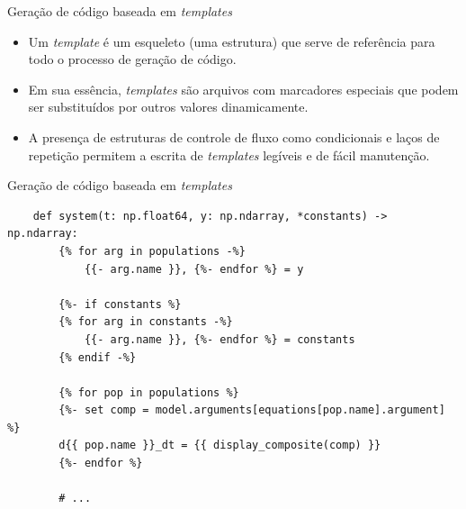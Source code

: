\begin{frame}{Geração de código baseada em \textit{templates}}
    \begin{itemize}
        \item Um \textit{template} é um esqueleto (uma estrutura) que serve de referência para todo o processo de geração de código.
        \item Em sua essência, \textit{templates} são arquivos com marcadores especiais que podem ser substituídos por outros valores dinamicamente.
        \item A presença de estruturas de controle de fluxo como condicionais e laços de repetição permitem a escrita de \textit{templates} legíveis e de fácil manutenção.
    \end{itemize}
\end{frame}

\begin{frame}[fragile]{Geração de código baseada em \textit{templates}}
    \begin{verbatim}
    def system(t: np.float64, y: np.ndarray, *constants) -> np.ndarray:
        {% for arg in populations -%}
            {{- arg.name }}, {%- endfor %} = y

        {%- if constants %}
        {% for arg in constants -%}
            {{- arg.name }}, {%- endfor %} = constants
        {% endif -%}

        {% for pop in populations %}
        {%- set comp = model.arguments[equations[pop.name].argument] %}
        d{{ pop.name }}_dt = {{ display_composite(comp) }}
        {%- endfor %}

        # ...
    \end{verbatim}
\end{frame}

